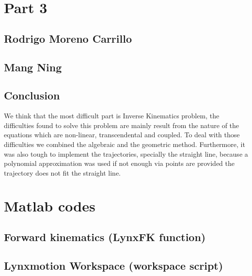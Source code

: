 \documentclass{article}
\begin{document}
\section{Part 3}
\subsection{Rodrigo Moreno Carrillo}


\subsection{Mang Ning}


\subsection{Conclusion}
We think that the most difficult part is Inverse Kinematics problem, the difficulties found to solve this problem are mainly result from the nature of the equations which are non-linear,  transcendental and coupled. To deal with those difficulties we combined the algebraic and the geometric method. Furthermore, it was also tough to implement the trajectories, specially the straight line, because a polynomial approximation was used if not enough via points are provided the trajectory does not fit the straight line.









\appendix
\section{Matlab codes}
\subsection{Forward kinematics (LynxFK function)}
\label{apendix:LynxFK}


\subsection{Lynxmotion Workspace (workspace script)}
\label{apendix:lynx_workspace}

\end{document}
